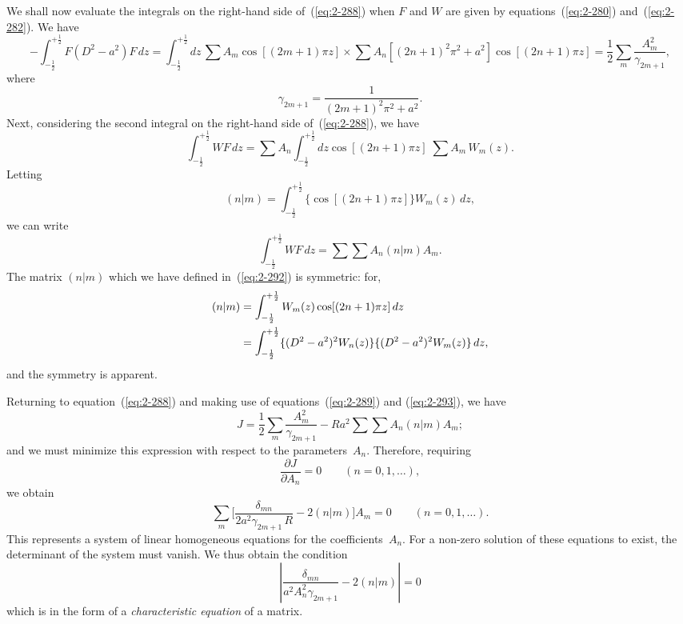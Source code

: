 We shall now evaluate the integrals on the right-hand side of~(\ref{eq:2-288})
when $F$ and $W$ are given by equations~(\ref{eq:2-280}) and~(\ref{eq:2-282}). We have
\begin{equation}
\label{eq:2-289}
-\int_{-\frac{1}{2}}^{+\frac{1}{2}} F(D^2 - a^2)F\,dz = \int_{-\frac{1}{2}}^{+\frac{1}{2}} dz\,\sum A_m\cos[(2m+1)\pi z] \times
\sum A_n[(2n+1)^2\pi^2+a^2]\cos[(2n+1)\pi z] = \frac{1}{2}\sum_m \frac{A_m^2}{\gamma_{2m+1}},
\end{equation}
where
\begin{equation}
\label{eq:2-290}
\gamma_{2m+1} = \frac{1}{(2m+1)^2\pi^2+a^2}.
\end{equation}
Next, considering the second integral on the right-hand side of~(\ref{eq:2-288}), we
have
\begin{equation}
\label{eq:2-291}
\int_{-\frac{1}{2}}^{+\frac{1}{2}} WF\,dz = \sum A_n \int_{-\frac{1}{2}}^{+\frac{1}{2}} dz\cos[(2n+1)\pi z]\;\sum A_m\,W_m(z).
\end{equation}
Letting
\begin{equation}
\label{eq:2-292}
(n|m) = \int_{-\frac{1}{2}}^{+\frac{1}{2}} \{\cos[(2n+1)\pi z]\}W_m(z)\,dz,
\end{equation}
we can write
\begin{equation}
\label{eq:2-293}
\int_{-\frac{1}{2}}^{+\frac{1}{2}} WF\,dz = \sum\sum A_n(n|m)A_m.
\end{equation}
The matrix $(n|m)$ which we have defined in~(\ref{eq:2-292}) is symmetric: for,
\begin{align}
\label{eq:2-294}
(n|m) &= \int_{-\frac{1}{2}}^{+\frac{1}{2}} W_m(z)\cos[(2n+1)\pi z]\,dz \notag\\
&= \int_{-\frac{1}{2}}^{+\frac{1}{2}} \{(D^2-a^2)^2 W_n(z)\}\{(D^2-a^2)^2 W_m(z)\}\,dz,
\end{align}
and the symmetry is apparent.

Returning to equation~(\ref{eq:2-288}) and making use of equations~(\ref{eq:2-289}) and
(\ref{eq:2-293}), we have
\begin{equation}
\label{eq:2-295}
J = \frac{1}{2}\sum_m \frac{A_m^2}{\gamma_{2m+1}} - Ra^2 \sum\sum A_n(n|m)A_m;
\end{equation}
and we must minimize this expression with respect to the parameters~$A_n$.
Therefore, requiring
\begin{equation}
\label{eq:2-296}
\frac{\partial J}{\partial A_n} = 0 \qquad (n = 0, 1, \ldots),
\end{equation}
we obtain
\begin{equation}
\label{eq:2-297}
\sum_m \biggl[\frac{\delta_{mn}}{2a^2\gamma_{2m+1}\,R} - 2(n|m)\biggr] A_m = 0 \qquad (n = 0, 1, \ldots).
\end{equation}
This represents a system of linear homogeneous equations for the
coefficients~$A_n$. For a non-zero solution of these equations to exist, the
determinant of the system must vanish. We thus obtain the condition
\begin{equation}
\label{eq:2-298}
\left|\frac{\delta_{mn}}{a^2 A_n^2 \gamma_{2m+1}} - 2(n|m)\right| = 0
\end{equation}
which is in the form of a \emph{characteristic equation} of a matrix.

